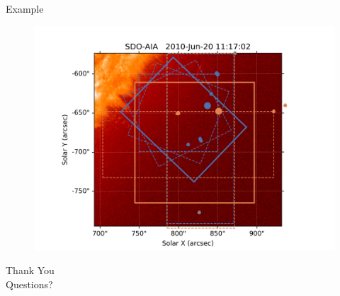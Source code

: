 \documentclass{beamer}
\begin{document}
\begin{frame}{Example}
{\begin{figure}[]
        \includegraphics[width=\linewidth]{images/aggexample1.png}
\end{figure}}
\end{frame}


\begin{frame}[t]
    \vspace{2cm}
    \centering\Huge Thank You\\
    \vspace{2cm}
    \centering\Large Questions?
\end{frame}
\end{document}
